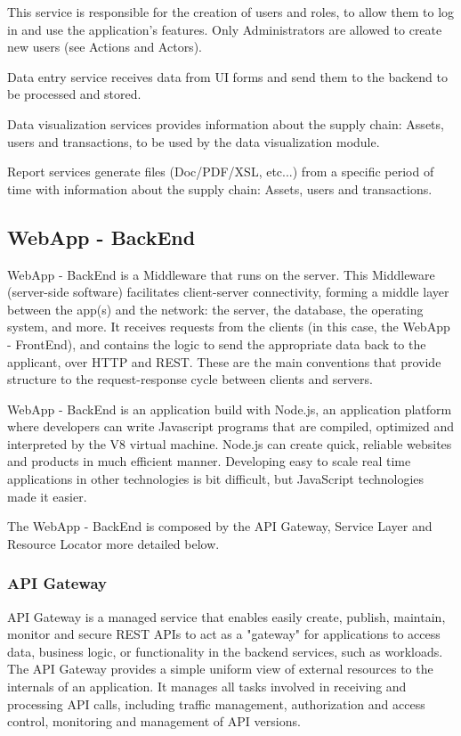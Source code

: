 This service is responsible for the creation of users and roles, to allow them to log in and use the application’s features. Only Administrators are allowed to create new users (see Actions and Actors).

Data entry service receives data from UI forms and send them to the backend to be processed and stored.

Data visualization services provides information about the supply chain: Assets, users and transactions, to be used by the data visualization module.

Report services generate files (Doc/PDF/XSL, etc...) from a specific period of time with information about the supply chain: Assets, users and transactions.

\subsection{WebApp - BackEnd}\label{sec:WebAppBackEnd}
WebApp - BackEnd is a Middleware that runs on the server. This Middleware (server-side software) facilitates client-server connectivity, forming a middle layer between the app(s) and the network: the server, the database, the operating system, and more. It receives requests from the clients (in this case, the WebApp - FrontEnd), and contains the logic to send the appropriate data back to the applicant, over HTTP and REST.  These are the main conventions that provide structure to the request-response cycle between clients and servers.

WebApp - BackEnd is an application build with Node.js, an application platform where developers can write Javascript programs that are compiled, optimized and interpreted by the V8 virtual machine. Node.js can create quick, reliable websites and products in much efficient manner. Developing easy to scale real time applications in other technologies is bit difficult, but JavaScript technologies made it easier.

The WebApp - BackEnd is composed by the API Gateway, Service Layer and Resource Locator more detailed below.

\subsubsection{API Gateway}\label{sec:APIGateway}
API Gateway is a managed service that enables easily create, publish, maintain, monitor and secure REST APIs to act as a "gateway" for applications to access data, business logic, or functionality in the backend services, such as workloads. The API Gateway provides a simple uniform view of external resources to the internals of an application. It manages all tasks involved in receiving and processing API calls, including traffic management, authorization and access control, monitoring and management of API versions.

